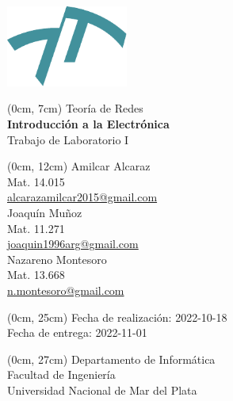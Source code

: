 \newcommand{\materia}[1]{{\huge #1}\\\vspace{0.5cm}}
\newcommand{\titulo}[1]{{\Huge \textbf{#1}}\\\vspace{0.5cm}}
\newcommand{\subtitulo}[1]{{\huge #1}\\\vspace{0.5cm}}
\newcommand{\autor}[3]{#1\\{\small Mat. #2\\\href{mailto:#3}{#3}}\\\vspace{0.7cm}}
\newcommand{\fecha}[4]{{\small Fecha de #1: #4-#3-#2}\\} %
\newcommand{\departamento}[1]{{\small Departamento de #1\\Facultad de Ingeniería\\Universidad Nacional de Mar del Plata}}
\newenvironment{mytitlepage}
    {\pagenumbering{gobble}\begin{center}}
    {\end{center}\newpage\pagenumbering{arabic}}

\begin{mytitlepage}
    \includegraphics[width=4cm]{img/logo-fi.pdf}
   
    \begin{textblock*}{\paperwidth}(0cm, 7cm)
    \materia{Teoría de Redes}
    \titulo{Introducción a la Electrónica}
    \subtitulo{Trabajo de Laboratorio I}
    \end{textblock*}
    
    \begin{textblock*}{\paperwidth}(0cm, 12cm)
    \autor{Amilcar Alcaraz}{14.015}{alcarazamilcar2015@gmail.com}
    \autor{Joaquín Muñoz}{11.271}{joaquin1996arg@gmail.com}
    \autor{Nazareno Montesoro}{13.668}{n.montesoro@gmail.com}
    \end{textblock*}
    
    \begin{textblock*}{\paperwidth}(0cm, 25cm) 
    \fecha{realización}{18}{10}{2022}
    \fecha{entrega}{01}{11}{2022}
    \end{textblock*}
    
    \begin{textblock*}{\paperwidth}(0cm, 27cm) 
    \departamento{Informática}
    \end{textblock*}
\end{mytitlepage}
